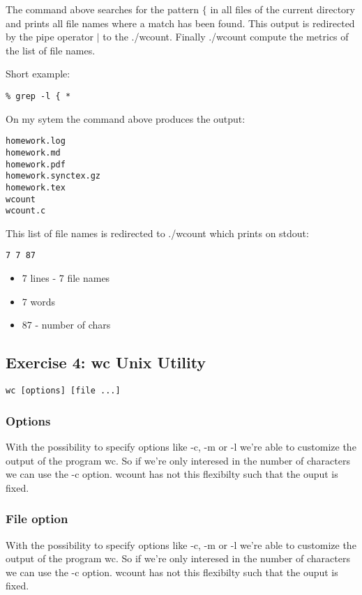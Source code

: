 \documentclass[12pt]{article}
\begin{document}
The command above searches for the pattern $\{$ in all files of the current directory and prints all file names where a match has been found. This output is redirected by the pipe operator $|$ to the ./wcount. Finally ./wcount compute the metrics of the list of file names.

Short example:
\begin{lstlisting}
% grep -l { * 
\end{lstlisting}
On my sytem the command above produces the output:

\begin{lstlisting}
homework.log
homework.md
homework.pdf
homework.synctex.gz
homework.tex
wcount
wcount.c
\end{lstlisting}

This list of file names is redirected to ./wcount which prints on stdout:
\begin{lstlisting}
7 7 87
\end{lstlisting}
\begin{itemize}
	\item 7 lines - 7 file names
	\item 7 words
	\item 87 - number of chars
\end{itemize}

\subsection*{Exercise 4: wc Unix Utility}
\begin{lstlisting}
wc [options] [file ...]
\end{lstlisting}
\subsubsection*{Options}
With the possibility to specify options like -c, -m or -l we're able to customize the output of the program wc. 
So if we're only interesed in the number of characters we can use the -c option.
wcount has not this flexibilty such that the ouput is fixed.

\subsubsection*{File option}
With the possibility to specify options like -c, -m or -l we're able to customize the output of the program wc. 
So if we're only interesed in the number of characters we can use the -c option.
wcount has not this flexibilty such that the ouput is fixed.
\end{document}
